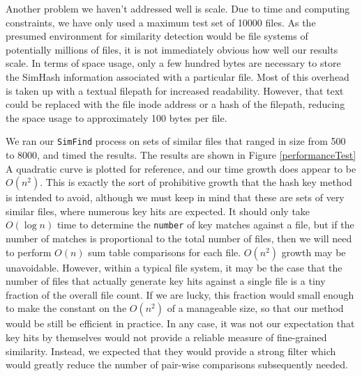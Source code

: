 \documentclass[10pt, twocolumn]{article}
\begin{document}
Another problem we haven't addressed well is scale.  Due to time and computing constraints, we have only used a maximum test set of 10000 files.  As the presumed environment for similarity detection would be file systems of potentially millions of files, it is not immediately obvious how well our results scale.  In terms of space usage, only a few hundred bytes are necessary to store the SimHash information associated with a particular file. Most of this overhead is taken up with a textual filepath for increased readability. However, that text could be replaced with the file inode address or a hash of the filepath, reducing the space usage to approximately 100 bytes per file. 

We ran our {\tt SimFind} process on sets of similar files that ranged in size from 500 to 8000, and timed the results.  The results are shown in Figure \ref{performanceTest}  A quadratic curve is plotted for reference, and our time growth does appear to be $O(n^2)$.  This is exactly the sort of prohibitive growth that the hash key method is intended to avoid, although we must keep in mind that these are sets of very similar files, where numerous key hits are expected.  It should only take $O(\log n)$ time to determine the {\tt number} of key matches against a file, but if the number of matches is proportional to the total number of files, then we will need to perform $O(n)$ sum table comparisons for each file.  $O(n^2)$ growth may be unavoidable.  However, within a typical file system, it may be the case that the number of files that actually generate key hits against a single file is a tiny fraction of the overall file count.  If we are lucky, this fraction would small enough to make the constant on the $O(n^2)$ of a manageable size, so that our method would be still be efficient in practice.  In any case, it was not our expectation that key hits by themselves would not provide a reliable measure of fine-grained similarity.  Instead, we expected that they would provide a strong filter which would greatly reduce the number of pair-wise comparisons subsequently needed.
\end{document}

